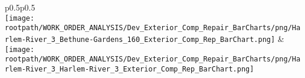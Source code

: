                         \begin{center}
                        \tablehead{\hspace{1cm}\\}
                        \tabletail{\hspace{1cm}\\}
                        \begin{supertabular}{p{0.5\textwidth}p{0.5\textwidth}}
                         \\
                        \texttt{[image: \\rootpath/WORK\_ORDER\_ANALYSIS/Dev\_Exterior\_Comp\_Repair\_BarCharts/png/Harlem-River\_3\_Bethune-Gardens\_160\_Exterior\_Comp\_Rep\_BarChart.png]} & \texttt{[image: \\rootpath/WORK\_ORDER\_ANALYSIS/Dev\_Exterior\_Comp\_Repair\_BarCharts/png/Harlem-River\_3\_Harlem-River\_3\_Exterior\_Comp\_Rep\_BarChart.png]} \\
                                        \end{supertabular}
\end{center}
